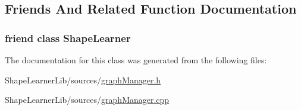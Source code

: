\subsection{Friends And Related Function Documentation}
\hypertarget{class_graph_manager_1_1_user_interface_a3a388a09d33d463cad9a452a65cab784}{}
\subsubsection[{Shape\+Learner}]{\setlength{\rightskip}{0pt plus 5cm}friend class {\bf Shape\+Learner}\hspace{0.3cm}{\ttfamily [friend]}}\label{class_graph_manager_1_1_user_interface_a3a388a09d33d463cad9a452a65cab784}


The documentation for this class was generated from the following files\+:\begin{DoxyCompactItemize}
\item 
Shape\+Learner\+Lib/sources/\hyperlink{graph_manager_8h}{graph\+Manager.\+h}\item 
Shape\+Learner\+Lib/sources/\hyperlink{graph_manager_8cpp}{graph\+Manager.\+cpp}\end{DoxyCompactItemize}
